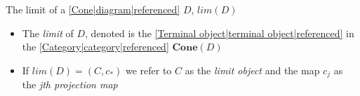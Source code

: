 
The limit of a \ref{Cone|diagram|referenced} $D$, $lim(D)$

\begin{itemize}
    \item  The \emph{limit} of $D$, denoted is the \ref{Terminal object|terminal object|referenced} in the \ref{Category|category|referenced} $\mathbf{Cone}(D)$
    \item If $lim(D)=(C,c_*)$ we refer to $C$ as the \emph{limit object} and the map $c_j$ as the \emph{jth projection map}

  \end{itemize}
